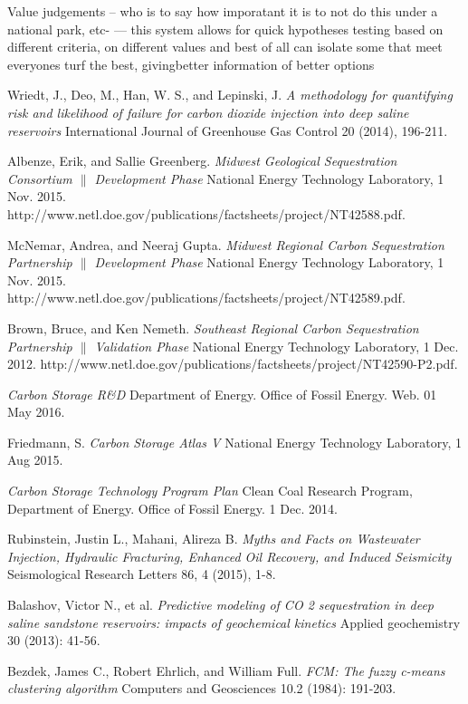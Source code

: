 \documentclass[a4paper, 12pt]{article}
\begin{document}
Value judgements -- who is to say how imporatant it is to not do this under a national park, etc- --- this system allows for quick hypotheses testing based on different criteria, on different values and best of all can isolate some that meet everyones turf the best, givingbetter information of better options 
 
\begin{thebibliography}{9}

Wriedt, J., Deo, M., Han, W. S., and Lepinski, J.
\textit{A methodology for quantifying risk and likelihood of failure for carbon dioxide injection into deep saline reservoirs}
International Journal of Greenhouse Gas Control 20 (2014), 196-211.

Albenze, Erik, and Sallie Greenberg. 
\textit{Midwest Geological Sequestration Consortium $\|$ Development Phase}
National Energy Technology Laboratory, 1 Nov. 2015. http://www.netl.doe.gov/publications/factsheets/project/NT42588.pdf.

McNemar, Andrea, and Neeraj Gupta. 
\textit{Midwest Regional Carbon Sequestration Partnership $\|$ Development Phase}
National Energy Technology Laboratory, 1 Nov. 2015. http://www.netl.doe.gov/publications/factsheets/project/NT42589.pdf.

Brown, Bruce, and Ken Nemeth. 
\textit{Southeast Regional Carbon Sequestration Partnership $\|$ Validation Phase}
National Energy Technology Laboratory, 1 Dec. 2012. http://www.netl.doe.gov/publications/factsheets/project/NT42590-P2.pdf.

\textit{Carbon Storage R\&D} Department of Energy. Office of Fossil Energy. Web. 01 May 2016.

Friedmann, S. 
\textit{Carbon Storage Atlas V} 
National Energy Technology Laboratory, 1 Aug 2015.

\textit{Carbon Storage Technology Program Plan}
Clean Coal Research Program, Department of Energy. Office of Fossil Energy. 1 Dec. 2014.

Rubinstein, Justin L., Mahani, Alireza B.
\textit{Myths and Facts on Wastewater Injection, Hydraulic Fracturing, Enhanced Oil Recovery, and Induced Seismicity}
Seismological Research Letters 86, 4 (2015), 1-8. 

Balashov, Victor N., et al.
\textit{Predictive modeling of CO 2 sequestration in deep saline sandstone reservoirs: impacts of geochemical kinetics}
Applied geochemistry 30 (2013): 41-56.

Bezdek, James C., Robert Ehrlich, and William Full.
\textit{FCM: The fuzzy c-means clustering algorithm}
Computers and Geosciences 10.2 (1984): 191-203.

\end{thebibliography}
\end{document}
